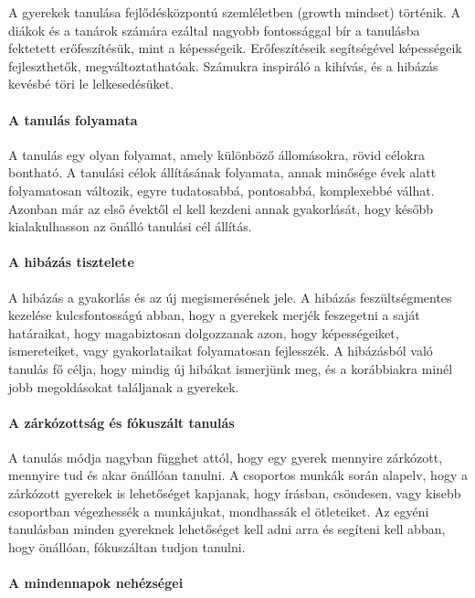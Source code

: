 A gyerekek tanulása fejlődésközpontú szemléletben (growth mindset)
történik. A diákok és a tanárok számára ezáltal nagyobb fontossággal
bír a tanulásba fektetett erőfeszítésük, mint a képességeik.
Erőfeszítéseik segítségével képességeik fejleszthetők,
megváltoztathatóak. Számukra inspiráló a kihívás, és a hibázás kevésbé
töri le lelkesedésüket.

\paragraph{A tanulás folyamata}

A tanulás egy olyan folyamat, amely különböző állomásokra, rövid célokra
bontható. A tanulási célok állításának folyamata, annak minősége évek
alatt folyamatosan változik, egyre tudatosabbá, pontosabbá, komplexebbé
válhat. Azonban már az első évektől el kell kezdeni annak gyakorlását,
hogy később kialakulhasson az önálló tanulási cél állítás.

\paragraph{A hibázás tisztelete}

A hibázás a gyakorlás és az új megismerésének jele. A hibázás
feszültségmentes kezelése kulcsfontosságú abban, hogy a gyerekek merjék
feszegetni a saját határaikat, hogy magabiztosan dolgozzanak azon, hogy
képességeiket, ismereteiket, vagy gyakorlataikat folyamatosan
fejlesszék. A hibázásból való tanulás fő célja, hogy mindig új hibákat
ismerjünk meg, és a korábbiakra minél jobb megoldásokat találjanak a
gyerekek.

\paragraph{A zárkózottság és fókuszált
      tanulás}

A tanulás módja nagyban függhet attól, hogy egy gyerek mennyire
zárkózott, mennyire tud és akar önállóan tanulni. A csoportos munkák
során alapelv, hogy a zárkózott gyerekek is lehetőséget kapjanak, hogy
írásban, csöndesen, vagy kisebb csoportban végezhessék a munkájukat,
mondhassák el ötleteiket. Az egyéni tanulásban minden gyereknek
lehetőséget kell adni arra és segíteni kell abban, hogy önállóan,
fókuszáltan tudjon tanulni.

\paragraph{A mindennapok
      nehézségei}

